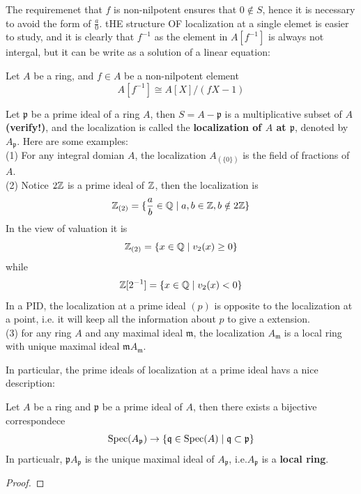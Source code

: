     The requiremenet that \(f\) is non-nilpotent ensures that \(0 \notin S\), hence it is necessary to avoid the form of \(\frac{a}{0}\). tHE structure OF localization at a single elemet is easier to study, and it is clearly that \(f^{-1}\) as the element in \(A[f^{-1}]\) is always not intergal, but it can be write as a solution of a linear equation:
    \begin{lemma}
        Let \(A\) be a ring, and \(f \in A\) be a non-nilpotent element
        \[A[f^{-1}] \cong A[X]/(fX-1)\]
    \end{lemma}

    \begin{example}
        Let \(\mathfrak{p}\) be a prime ideal of a ring \(A\), then \(S = A - \mathfrak{p}\) is a multiplicative subset of \(A\) \textbf{(verify!)}, and the localization is called the \textbf{localization of \(A\) at \(\mathfrak{p}\)}, denoted by \(A_{\mathfrak{p}}\). Here are some examples:\\

        (1) For any integral domian \(A\), the localization \(A_{(\{0\})}\) is the field of fractions of \(A\).\\

        (2) Notice \(2\mathbb{Z}\) is a prime ideal of \(\mathbb{Z}\), then the localization is
        \[\mathbb{Z}_{(2)} = \{\frac{a}{b} \in \mathbb{Q} \mid a,b \in \mathbb{Z}, b \notin 2\mathbb{Z}\} \]
        In the view of valuation it is
        \[\mathbb{Z}_{(2)} = \{x \in \mathbb{Q} \mid v_2(x) \geq 0\}\]
        while
        \[\mathbb{Z}[2^{-1}] = \{x \in \mathbb{Q} \mid v_2(x) < 0 \}\]
        In a PID, the localization at a prime ideal \((p)\) is opposite to the localization at a point, i.e. it will keep all the information about \(p\) to give a extension.\\ 

        (3) for any ring \(A\) and any maximal ideal \(\mathfrak{m}\), the localization \(A_{\mathfrak{m}}\) is a local ring with unique maximal ideal \(\mathfrak{m}A_{\mathfrak{m}}\).\\
    \end{example}

    In particular, the prime ideals of localization at a prime ideal havs a nice description:

    \begin{lemma}
        Let \(A\) be a ring and \(\mathfrak{p}\) be a prime ideal of \(A\), then there exists a bijective correspondece
        \[\operatorname{Spec}(A_{\mathfrak{p}}) \to \{\mathfrak{q} \in \operatorname{Spec}(A) \mid \mathfrak{q} \subset \mathfrak{p}\}\]
        In particualr, \(\mathfrak{p}A_{\mathfrak{p}}\) is the unique maximal ideal of \(A_{\mathfrak{p}}\), i.e.\(A_{\mathfrak{p}}\) is a \textbf{local ring}.
    \end{lemma}
    \begin{proof}
        
    \end{proof}

